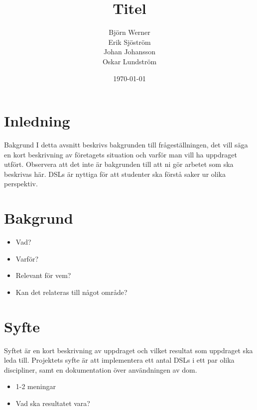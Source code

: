 \documentclass[12pt,a4paper]{article}
\begin{document}
 


\title{Titel}
\date{\today}
\author{Björn Werner\\ Erik Sjöström \\ Johan Johansson \\ Oskar Lundström}

\maketitle

\newpage
\tableofcontents

\newpage
\setcounter{page}{1}
\setlength{\parskip}{0pt plus 1pt}

\section{Inledning}

Bakgrund I detta avsnitt beskrivs bakgrunden till frågeställningen,
det vill säga en kort beskrivning av företagets situation och varför man vill
ha uppdraget utfört. Observera att det inte är bakgrunden till att ni gör arbetet
som ska beskrivas här.
DSLs är nyttiga för att studenter ska förstå saker ur olika perspektiv.

\section{Bakgrund}

\begin{itemize}
    \item Vad?
    \item Varför?
    \item Relevant för vem?
    \item Kan det relateras till något område?
\end{itemize}

\section{Syfte}

Syftet är en kort beskrivning av uppdraget och vilket resultat som uppdraget
ska leda till.
Projektets syfte är att implementera ett antal DSLs i ett par olika discipliner, samt
en dokumentation över användningen av dom.

\begin{itemize}
    \item 1-2 meningar
    \item Vad ska resultatet vara?
\end{itemize}
\end{document}
